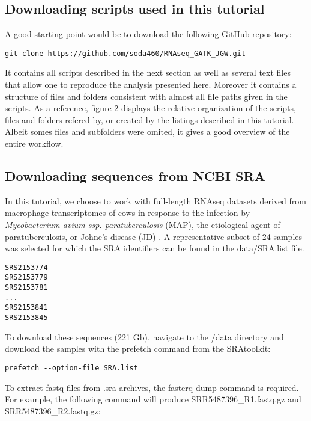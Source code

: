 \subsection{Downloading scripts used in this tutorial}

A good starting point would be to download the following GitHub repository:

\begin{verbatim}
git clone https://github.com/soda460/RNAseq_GATK_JGW.git
\end{verbatim}

It contains all scripts described in the next section as well as several text files that allow one to reproduce the analysis presented here. Moreover it contains a structure of files and folders consistent with almost all file paths given in the scripts. As a reference, figure 2 displays the relative organization of the scripts, files and folders refered by, or created by the listings described in this tutorial. Albeit somes files and subfolders were omited, it gives a good overview of the entire workflow.





\subsection{Downloading sequences from NCBI SRA}

In this tutorial, we choose to work with full-length RNAseq datasets derived from macrophage transcriptomes of cows in response to the infection by \textit{Mycobacterium avium ssp. paratuberculosis } (MAP), the etiological agent of paratuberculosis, or Johne’s disease (JD) \cite{Ariel2021}. A representative subset of 24 samples was selected for which the SRA identifiers can be found in the data/SRA.list file.

\begin{verbatim}
SRS2153774
SRS2153779
SRS2153781
...
SRS2153841
SRS2153845
\end{verbatim}


To download these sequences (221 Gb), navigate to the /data directory and download the samples with the prefetch command from the SRAtoolkit:

\begin{verbatim}
prefetch --option-file SRA.list
\end{verbatim}

To extract fastq files from .sra archives, the fasterq-dump command is required. For example, the following command will produce SRR5487396\_R1.fastq.gz and SRR5487396\_R2.fastq.gz:

